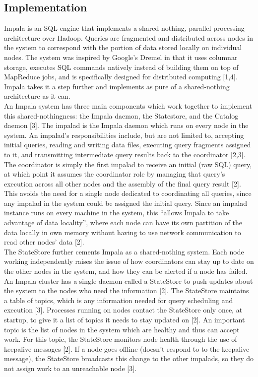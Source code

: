 \documentclass[onecolumn, draftclsnofoot,10pt, compsoc]{IEEEtran}
\begin{document}
    \subsection{Implementation}
    \indent Impala is an SQL engine that implements a shared-nothing, parallel processing architecture over Hadoop. Queries are fragmented and distributed across nodes in the system to correspond with the portion of data stored locally on individual nodes. The system was inspired by Google’s Dremel in that it uses columnar storage, executes SQL commands natively instead of building them on top of MapReduce jobs, and is specifically designed for distributed computing [1,4]. Impala takes it a step further and implements as pure of a shared-nothing architecture as it can. \\

\indent An Impala system has three main components which work together to implement this shared-nothingness: the Impala daemon, the Statestore, and the Catalog daemon [3]. The impalad is the Impala daemon which runs on every node in the system. An impalad’s responsibilities include, but are not limited to, accepting initial queries, reading and writing data files, executing query fragments assigned to it, and transmitting intermediate query results back to the coordinator [2,3]. The coordinator is simply the first impalad to receive an initial (raw SQL) query, at which point it assumes the coordinator role by managing that query’s execution across all other nodes and the assembly of the final query result [2]. This avoids the need for a single node dedicated to coordinating all queries, since any impalad in the system could be assigned the initial query. Since an impalad instance runs on every machine in the system, this “allows Impala to take advantage of data locality”, where each node can have its own partition of the data locally in own memory without having to use network communication to read other nodes’ data [2]. \\

\indent The StateStore further cements Impala as a shared-nothing system. Each node working independently raises the issue of how coordinators can stay up to date on the other nodes in the system, and how they can be alerted if a node has failed. An Impala cluster has a single daemon called a StateStore to push updates about the system to the nodes who need the information [2]. The StateStore maintains a table of topics, which is any information needed for query scheduling and execution [3]. Processes running on nodes contact the StateStore only once, at startup, to give it a list of topics it needs to stay updated on [2]. An important topic is the list of nodes in the system which are healthy and thus can accept work. For this topic, the StateStore monitors node health through the use of keepalive messages [2]. If a node goes offline (doesn’t respond to to the keepalive message), the StateStore broadcasts this change to the other impalads, so they do not assign work to an unreachable node [3]. \\
\end{document}

